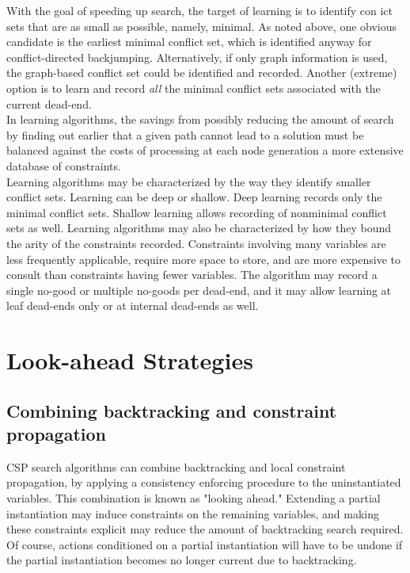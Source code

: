 \documentclass{article}
\begin{document}
With the goal of speeding up search, the target of learning is to identify
con ict sets that are as small as possible, namely, minimal. As noted above, one
obvious candidate is the earliest minimal conflict set, which is identified anyway
for conflict-directed backjumping. Alternatively, if only graph information is
used, the graph-based conflict set could be identified and recorded. Another
(extreme) option is to learn and record \textit{all} the minimal conflict sets associated
with the current dead-end. \\

In learning algorithms, the savings from possibly reducing the amount of
search by finding out earlier that a given path cannot lead to a solution must
be balanced against the costs of processing at each node generation a more
extensive database of constraints. \\

Learning algorithms may be characterized by the way they identify smaller
conflict sets. Learning can be deep or shallow. Deep learning records only the
minimal conflict sets. Shallow learning allows recording of nonminimal conflict
sets as well. Learning algorithms may also be characterized by how they bound
the arity of the constraints recorded. Constraints involving many variables are
less frequently applicable, require more space to store, and are more expensive
to consult than constraints having fewer variables. The algorithm may record a
single no-good or multiple no-goods per dead-end, and it may allow learning at
leaf dead-ends only or at internal dead-ends as well.
\section{Look-ahead Strategies}
\subsection{Combining backtracking and constraint propagation}
CSP search algorithms can combine backtracking and local constraint propagation, by applying a consistency enforcing procedure to the uninstantiated
variables. This combination is known as "looking ahead." Extending a partial
instantiation may induce constraints on the remaining variables, and making
these constraints explicit may reduce the amount of backtracking search required. Of course, actions conditioned on a partial instantiation will have to be
undone if the partial instantiation becomes no longer current due to backtracking.
\end{document}
